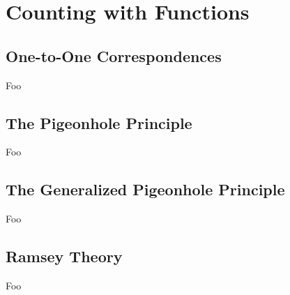 \section{Counting with Functions}

\subsection{One-to-One Correspondences}

Foo

\subsection{The Pigeonhole Principle}

Foo

\subsection{The Generalized Pigeonhole Principle}

Foo

\subsection{Ramsey Theory}

Foo

